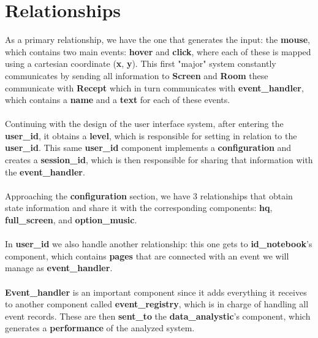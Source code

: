 \documentclass{article}
\begin{document}
\section*{Relationships}

\par
As a primary relationship, we have the one that generates the input: the \textbf{\textbf{mouse}}, 
which contains two main events: \textbf{\textbf{hover}} and \textbf{\textbf{click}}, where each 
of these is mapped using a cartesian coordinate (\textbf{\textbf{x}}, \textbf{\textbf{y}}). This 
first "major" system constantly communicates by sending all information 
to \textbf{Screen} and \textbf{Room} these communicate with \textbf{Recept} which in turn communicates with \textbf{event\_handler}, 
which contains a \textbf{\textbf{name}} and 
a \textbf{\textbf{text}} for each of these events.
\\
\\
Continuing with the design of the user interface system, after entering the
 \textbf{\textbf{user\_id}}, it obtains a \textbf{\textbf{level}}, which is responsible for 
 setting in relation to the \textbf{\textbf{user\_id}}. This same \textbf{\textbf{user\_id}} 
 component implements a \textbf{\textbf{configuration}} and creates a \textbf{\textbf{session\_id}},
  which is then responsible for sharing that information with the \textbf{\textbf{event\_handler}}.
  \\
  \\
Approaching the \textbf{\textbf{configuration}} section, we have 3 relationships that obtain state
 information and share it with the corresponding components: \textbf{\textbf{hq}},
  \textbf{\textbf{full\_screen}}, and \textbf{\textbf{option\_music}}. 
  \\
 \\
 In \textbf{\textbf{user\_id}} we also handle another relationship: this one gets to 
\textbf{\textbf{id\_notebook}}’s component, which contains \textbf{\textbf{pages}} 
that are connected with an event we will manage as \textbf{\textbf{event\_handler}}.
\\
\\
\textbf{\textbf{Event\_handler}} is an important component since it adds everything it receives 
to another component called \textbf{\textbf{event\_registry}}, which is in charge of handling all 
event records. These are then \textbf{\textbf{sent\_to}} the \textbf{\textbf{data\_analystic}}’s 
component, which generates a \textbf{\textbf{performance}} of the analyzed system.
\end{document}
